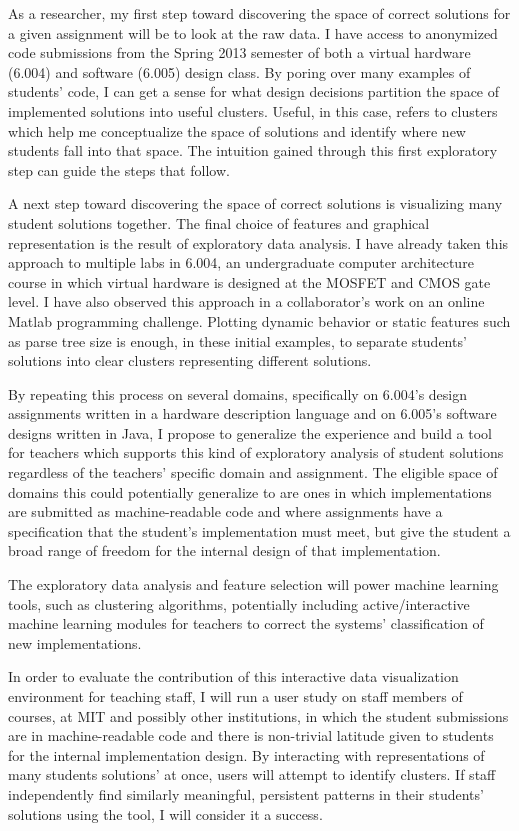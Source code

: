 \documentclass[12pt]{article}
\begin{document}
As a researcher, my first step toward discovering the space of correct solutions for a given assignment will be to look at the raw data. I have access to anonymized code submissions from the Spring 2013 semester of both a virtual hardware (6.004) and software (6.005) design class. By poring over many examples of students' code, I can get a sense for what design decisions partition the space of implemented solutions into useful clusters. Useful, in this case, refers to clusters which help me conceptualize the space of solutions and identify where new students fall into that space. The intuition gained through this first exploratory step can guide the steps that follow.

A next step toward discovering the space of correct solutions is visualizing many student solutions together. The final choice of features and graphical representation is the result of exploratory data analysis. I have already taken this approach to multiple labs in 6.004, an undergraduate computer architecture course in which virtual hardware is designed at the MOSFET and CMOS gate level. I have also observed this approach in a collaborator's work on an online Matlab programming challenge. Plotting dynamic behavior or static features such as parse tree size is enough, in these initial examples, to separate students' solutions into clear clusters representing different solutions.

By repeating this process on several domains, specifically on 6.004's design assignments written in a hardware description language and on 6.005's software designs written in Java, I propose to generalize the experience and build a tool for teachers which supports this kind of exploratory analysis of student solutions regardless of the teachers' specific domain and assignment. The eligible space of domains this could potentially generalize to are ones in which implementations are submitted as machine-readable code and where assignments have a specification that the student's implementation must meet, but give the student a broad range of freedom for the internal design of that implementation.

The exploratory data analysis and feature selection will power machine learning tools, such as clustering algorithms, potentially including active/interactive machine learning modules for teachers to correct the systems' classification of new implementations. 

In order to evaluate the contribution of this interactive data visualization environment for teaching staff, I will run a user study on staff members of courses, at MIT and possibly other institutions, in which the student submissions are in machine-readable code and there is non-trivial latitude given to students for the internal implementation design. By interacting with representations of many students solutions' at once, users will attempt to identify clusters. If staff independently find similarly meaningful, persistent patterns in their students' solutions using the tool, I will consider it a success.
\end{document}

